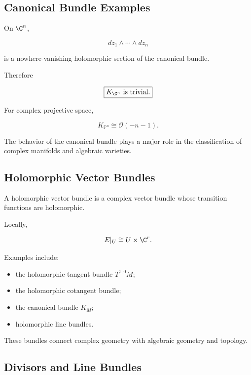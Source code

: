\subsection{Canonical Bundle Examples}
\label{subsec:canonical-bundle-examples}

On \(\C^n\),

\[
dz_1\wedge\cdots\wedge dz_n
\]

is a nowhere-vanishing holomorphic section of the canonical bundle.

Therefore

\[
\boxed{
K_{\C^n}
\text{ is trivial}.
}
\]

For complex projective space,

\[
\boxed{
K_{\mathbb{P}^n}
\cong
\mathcal{O}(-n-1).
}
\]

The behavior of the canonical bundle plays a major role in the classification
of complex manifolds and algebraic varieties.

\subsection{Holomorphic Vector Bundles}
\label{subsec:holomorphic-vector-bundles}

A holomorphic vector bundle is a complex vector bundle whose transition
functions are holomorphic.

Locally,

\[
E|_U\cong U\times\C^r.
\]

Examples include:

\begin{itemize}
    \item the holomorphic tangent bundle \(T^{1,0}M\);
    \item the holomorphic cotangent bundle;
    \item the canonical bundle \(K_M\);
    \item holomorphic line bundles.
\end{itemize}

These bundles connect complex geometry with algebraic geometry and topology.

\subsection{Divisors and Line Bundles}
\label{subsec:complex-divisors-line-bundles}

